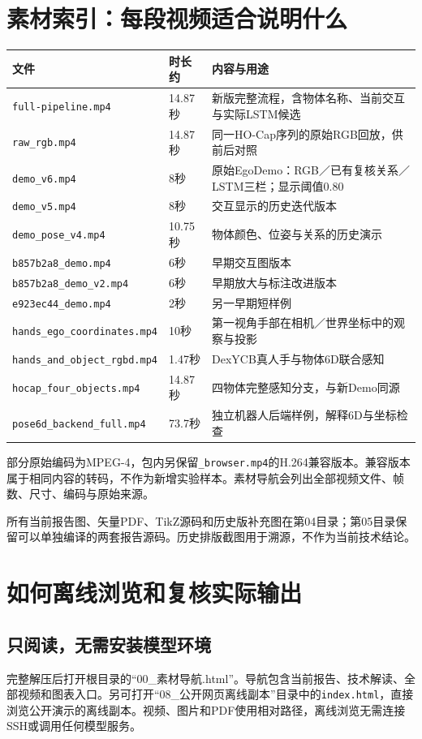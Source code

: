 \documentclass[11pt,a4paper,UTF8,fontset=fandol]{ctexart}
\newcommand{\code}[1]{{\small\nolinkurl{#1}}}
\begin{document}
\section{素材索引：每段视频适合说明什么}
\begin{longtable}{p{5.6cm}p{1.5cm}p{6.3cm}}
\toprule 文件 & 时长约 & 内容与用途\\\midrule\endhead
\code{full-pipeline.mp4} & 14.87秒 & 新版完整流程，含物体名称、当前交互与实际LSTM候选\\
\code{raw_rgb.mp4} & 14.87秒 & 同一HO-Cap序列的原始RGB回放，供前后对照\\
\code{demo_v6.mp4} & 8秒 & 原始EgoDemo：RGB／已有复核关系／LSTM三栏；显示阈值0.80\\
\code{demo_v5.mp4} & 8秒 & 交互显示的历史迭代版本\\
\code{demo_pose_v4.mp4} & 10.75秒 & 物体颜色、位姿与关系的历史演示\\
\code{b857b2a8_demo.mp4} & 6秒 & 早期交互图版本\\
\code{b857b2a8_demo_v2.mp4} & 6秒 & 早期放大与标注改进版本\\
\code{e923ec44_demo.mp4} & 2秒 & 另一早期短样例\\
\code{hands_ego_coordinates.mp4} & 10秒 & 第一视角手部在相机／世界坐标中的观察与投影\\
\code{hands_and_object_rgbd.mp4} & 1.47秒 & DexYCB真人手与物体6D联合感知\\
\code{hocap_four_objects.mp4} & 14.87秒 & 四物体完整感知分支，与新Demo同源\\
\code{pose6d_backend_full.mp4} & 73.7秒 & 独立机器人后端样例，解释6D与坐标检查\\\bottomrule
\end{longtable}
部分原始编码为MPEG-4，包内另保留\code{_browser.mp4}的H.264兼容版本。兼容版本属于相同内容的转码，不作为新增实验样本。素材导航会列出全部视频文件、帧数、尺寸、编码与原始来源。

所有当前报告图、矢量PDF、TikZ源码和历史版补充图在第04目录；第05目录保留可以单独编译的两套报告源码。历史排版截图用于溯源，不作为当前技术结论。

\section{如何离线浏览和复核实际输出}
\subsection{只阅读，无需安装模型环境}
完整解压后打开根目录的“00\_素材导航.html”。导航包含当前报告、技术解读、全部视频和图表入口。另可打开“08\_公开网页离线副本”目录中的\code{index.html}，直接浏览公开演示的离线副本。视频、图片和PDF使用相对路径，离线浏览无需连接SSH或调用任何模型服务。
\end{document}

